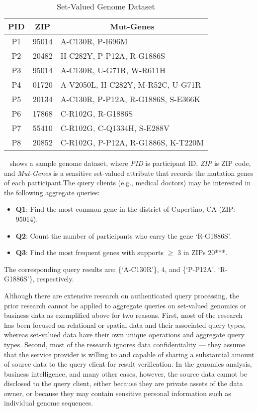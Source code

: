 \begin{table}[t]
  \centering
  \begin{tabular}{ccl}
    \toprule
    \textbf{PID} & \textbf{ZIP} & \multicolumn{1}{c}{\textbf{Mut-Genes}}\\
    \midrule
    P1&95014&A-C130R, P-I696M\\
    P2&20482&H-C282Y, P-P12A, R-G1886S \\
    P3&95014&A-C130R, U-G71R, W-R611H\\
    P4&01720&A-V2050L, H-C282Y, M-R52C, U-G71R\\
    P5&20134&A-C130R, P-P12A, R-G1886S, S-E366K\\
    P6&17868& C-R102G, R-G1886S\\
    P7&55410&C-R102G, C-Q1334H, S-E288V\\
    P8&20852&C-R102G, P-P12A, R-G1886S, K-T220M\\
    \bottomrule
  \end{tabular}
  \caption{Set-Valued Genome Dataset}\label{tab:intro:sample_pgp}
\end{table}

\begin{example}~\label{example:intro:pgp}
   shows a sample genome dataset, where \emph{PID} is participant ID, \emph{ZIP} is ZIP code, and \emph{Mut-Genes} is a sensitive set-valued attribute that records the mutation genes of each participant.The query clients (e.g., medical doctors) may be interested in the following aggregate queries:
    \begin{itemize}
      \item \textbf{Q1}: Find the most common gene in the district of Cupertino, CA (ZIP\@: 95014).
      \item \textbf{Q2}: Count the number of participants who carry the gene `R-G1886S'.
      \item \textbf{Q3}: Find the most frequent genes with supports $\ge$ 3 in ZIPs 20***.
    \end{itemize}
    The corresponding query results are: \{`A-C130R'\}, 4, and \{`P-P12A', `R-G1886S'\}, respectively.
\end{example}

Although there are extensive research on authenticated query processing, the prior research cannot be applied to aggregate queries on set-valued genomics or business data as exemplified above for two reasons. First, most of the research has been focused on relational or spatial data and their associated query types, whereas set-valued data have their own unique operations and aggregate query types. Second, most of the research ignores data confidentiality --- they assume that the service provider is willing to and capable of sharing a substantial amount of source data to the query client for result verification. In the genomics analysis, business intelligence, and many other cases, however, the source data cannot be disclosed to the query client, either because they are private assets of the data owner, or because they may contain sensitive personal information such as individual genome sequences.

